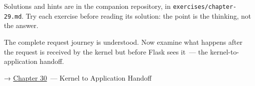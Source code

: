 \noindent{}Solutions and hints are in the companion repository, in \texttt{exercises/}\allowbreak{}\texttt{chapter-29.md}. Try each exercise before reading its solution: the point is the thinking, not the answer.

\label{29-client-server-journey:whats-next}

The complete request journey is understood. Now examine what happens after the request is received by the kernel but before Flask sees it~--- the kernel-to-application handoff.

\noindent{}→ \hyperref[ch:30-kernel-application-handoff]{Chapter 30}~--- Kernel to Application Handoff
